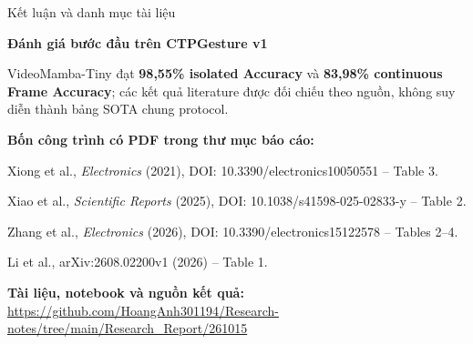 \documentclass[aspectratio=169,9pt]{beamer}
\newcommand{\smallnote}[1]{{\fontsize{7.1}{8.4}\selectfont #1\par}}
\newcommand{\tinytext}[1]{{\fontsize{6.3}{7.3}\selectfont #1\par}}
\begin{document}
\begin{frame}{Kết luận và danh mục tài liệu}
\begin{tcolorbox}[keypanel]\centering
{\bfseries\fontsize{12}{14}\selectfont Đánh giá bước đầu trên CTPGesture v1\par}
\vspace{0.10cm}
\smallnote{VideoMamba-Tiny đạt \textbf{98,55\% isolated Accuracy} và \textbf{83,98\% continuous Frame Accuracy}; các kết quả literature được đối chiếu theo nguồn, không suy diễn thành bảng SOTA chung protocol.}
\end{tcolorbox}
\vspace{0.14cm}
\smallnote{\textbf{Bốn công trình có PDF trong thư mục báo cáo:}}\par\vspace{0.08cm}
\tinytext{[P1] Xiong et al., \emph{Electronics} (2021), DOI: 10.3390/electronics10050551 -- Table 3.}\par\vspace{0.07cm}
\tinytext{[P2] Xiao et al., \emph{Scientific Reports} (2025), DOI: 10.1038/s41598-025-02833-y -- Table 2.}\par\vspace{0.07cm}
\tinytext{[P3] Zhang et al., \emph{Electronics} (2026), DOI: 10.3390/electronics15122578 -- Tables 2--4.}\par\vspace{0.07cm}
\tinytext{[P4] Li et al., arXiv:2608.02200v1 (2026) -- Table 1.}\par
\vspace{0.20cm}
\begin{tcolorbox}[panel]
\smallnote{\textbf{Tài liệu, notebook và nguồn kết quả:}\\
\url{https://github.com/HoangAnh301194/Research-notes/tree/main/Research_Report/261015}}
\end{tcolorbox}
\end{frame}
\end{document}
